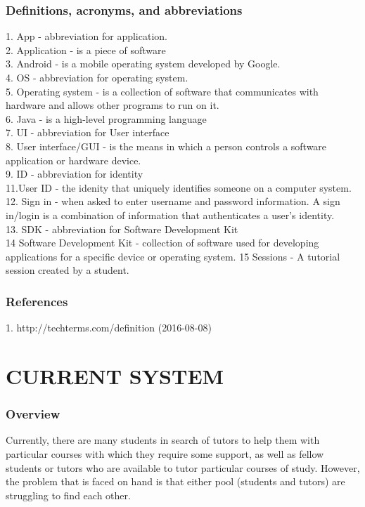 \documentclass[12pt]{article}
\begin{document}
\subsubsection{Definitions, acronyms, and abbreviations}
1. App - abbreviation for application. \\
2. Application - is a piece of software \\
3. Android - is a mobile operating system developed by Google. \\
4. OS - abbreviation for operating system.\\
5. Operating system - is a collection of software that communicates with hardware and allows other programs to run on it.\\
6. Java - is a high-level programming language\\
7. UI - abbreviation for User interface\\
8. User interface/GUI - is the means in which a person controls a software application or hardware device.\\
9. ID - abbreviation for identity\\
11.User ID - the idenity that uniquely identifies someone on a computer system.\\
12. Sign in - when asked to enter username and password information. A sign in/login is a combination of information that authenticates a user's identity. \\
13. SDK - abbreviation for Software Development Kit\\
14 Software Development Kit -  collection of software used for developing applications for a specific device or operating system.
15 Sessions - A tutorial session created by a student.


\subsubsection{References}
1. http://techterms.com/definition (2016-08-08)

\newpage


\section{CURRENT SYSTEM}
\subsubsection{Overview}
\begin{flushleft}

Currently, there are many students in search of tutors to help them with particular courses with which they require some support, as well as fellow students or tutors who are available to tutor particular courses of study. However, the problem that is faced on hand is that either pool (students and tutors) are struggling to find each other.
\end{flushleft}
\end{document}
